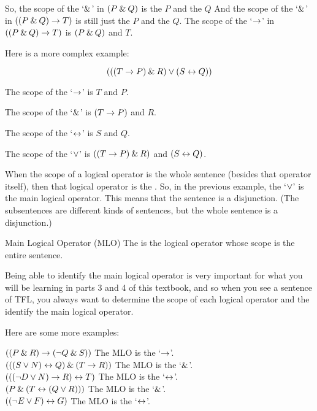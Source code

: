 So, the scope of the `$\mathbin{\&}$' in $(P \mathbin{\&} Q)$ is the $P$ and the $Q$ And the scope of the `$\mathbin{\&}$' in $((P \mathbin{\&} Q) \rightarrow T)$ is still just the $P$ and the $Q$. The scope of the `$\rightarrow$' in $((P \mathbin{\&} Q) \rightarrow T)$ is $(P \mathbin{\&} Q)$ and $T$.

Here is a more complex example:

$$(((T \rightarrow P) \mathbin{\&} R) \vee (S \leftrightarrow Q))$$

\begin{ebullet}
	\item[] The scope of the `$\rightarrow$' is $T$ and $P$. 
	\item[] The scope of the `$\mathbin{\&}$' is $(T \rightarrow P)$ and $R$.
	\item[] The scope of the `$\leftrightarrow$' is $S$ and $Q$.
	\item[] The scope of the `$\vee$' is $((T \rightarrow P) \mathbin{\&} R)$ and $(S \leftrightarrow Q)$.
\end{ebullet}

When the scope of a logical operator is the whole sentence (besides that operator itself), then that logical operator is the . So, in the previous example, the `$\vee$' is the main logical operator. This means that the sentence is a disjunction. (The subsentences are different kinds of sentences, but the whole sentence is a disjunction.)

\begin{factboxy}{Main Logical Operator (MLO)}
The  is the logical operator whose scope is the entire sentence. 
\end{factboxy}

Being able to identify the main logical operator is very important for what you will be learning in parts 3 and 4 of this textbook, and so when you see a sentence of TFL, you always want to determine the scope of each logical operator and the identify the main logical operator. 

Here are some more examples:
\begin{tabbing}
\quad$((P \mathbin{\&} R) \rightarrow ({\neg} Q \mathbin{\&} S))$ \qquad \qquad \qquad \= The MLO is the `$\rightarrow$'.\\\smallskip 
\quad$(((S \vee N) \leftrightarrow Q) \mathbin{\&} (T \rightarrow R))$ \> The MLO is the `$\mathbin{\&}$'.\\\smallskip
\quad$((({\neg} D \vee N) \rightarrow R) \leftrightarrow T)$ \> The MLO is the `$\leftrightarrow$'.\\\smallskip
\quad$(P \mathbin{\&} (T \leftrightarrow (Q \vee R)))$ \> The MLO is the `$\mathbin{\&}$'.\\\smallskip
\quad$(({\neg} E \vee F) \leftrightarrow G)$ \> The MLO is the `$\leftrightarrow$'.
\end{tabbing}


